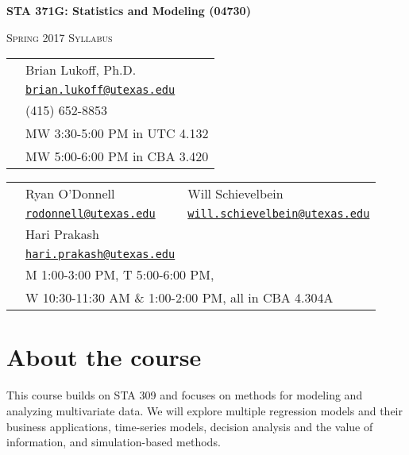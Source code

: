 \documentclass[12pt]{article}
\begin{document}
\pagestyle{fancy}
\thispagestyle{empty}

\begin{center}
\textbf{\Large STA 371G: Statistics and Modeling (04730)}

\textsc{\large Spring 2017 Syllabus}

\bigskip

\begin{tabular}{rl}
\noindent {\bf Instructor:} & Brian Lukoff, Ph.D. \\
\noindent {\bf Email:} & \href{mailto:brian.lukoff@utexas.edu}{\tt brian.lukoff@utexas.edu} \\
\noindent {\bf Phone:} & (415) 652-8853 \\
\noindent {\bf Class Meetings:} & MW 3:30-5:00 PM in UTC 4.132 \\
\noindent {\bf Office Hours:} & MW 5:00-6:00 PM in CBA 3.420 \\
\end{tabular}

\begin{tabular}{rll}
\noindent {\bf TA:} & Ryan O'Donnell & Will Schievelbein \\
\noindent {\bf Email:} & \href{mailto:rodonnell@utexas.edu}{\tt rodonnell@utexas.edu} & \href{mailto:will.schievelbein@utexas.edu}{\tt  will.schievelbein@utexas.edu} \\
\noindent {\bf TA:} & Hari Prakash \\
\noindent {\bf Email:} & \href{mailto:hari.prakash@utexas.edu}{\tt hari.prakash@utexas.edu} \\
\noindent {\bf Office Hours:} & \multicolumn{2}{l}{M 1:00-3:00 PM, T 5:00-6:00 PM, } \\
& \multicolumn{2}{l}{W 10:30-11:30 AM \& 1:00-2:00 PM, all in CBA 4.304A}  \\
\end{tabular}

\end{center}

\section*{About the course}

This course builds on STA 309 and focuses on methods for modeling and analyzing multivariate data.  We will explore multiple regression models and their business applications, time-series models, decision analysis and the value of information, and simulation-based methods.
\end{document}
